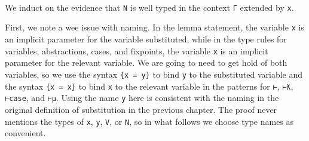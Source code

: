 \begin{fence}
\begin{code}
\>[25]\AgdaSpace{}%
\AgdaSymbol{(}\AgdaSpace{}%
\AgdaSpace{}%
\AgdaSymbol{)}\AgdaSpace{}%
\AgdaSymbol{(}\AgdaSpace{}%
\AgdaSpace{}%
\AgdaSymbol{)}\AgdaSpace{}%
\AgdaSymbol{(}\AgdaSpace{}%
\AgdaSpace{}%
\AgdaSymbol{(}\AgdaSpace{}%
\AgdaSpace{}%
\AgdaSymbol{))}\<%
\\
\>[0]\AgdaSpace{}%
\AgdaSymbol{\{}\AgdaSpace{}%
\AgdaSymbol{=}\AgdaSpace{}%
\AgdaSymbol{\}}\AgdaSpace{}%
\AgdaSpace{}%
\AgdaSymbol{(}\AgdaSpace{}%
\AgdaSymbol{\{}\AgdaSpace{}%
\AgdaSymbol{=}\AgdaSpace{}%
\AgdaSymbol{\}}\AgdaSpace{}%
\AgdaSymbol{)}\AgdaSpace{}%
\AgdaSpace{}%
\AgdaSpace{}%
\AgdaSpace{}%
\<%
\\
\>[0]\AgdaSpace{}%
\AgdaSymbol{|}\AgdaSpace{}%
\AgdaSpace{}%
%
\>[22]\AgdaSymbol{=}%
\>[25]\AgdaSpace{}%
\AgdaSymbol{(}\AgdaSpace{}%
\AgdaSymbol{)}\<%
\\
\>[0]\AgdaSpace{}%
\AgdaSymbol{|}\AgdaSpace{}%
%
\>[10]%
\>[22]\AgdaSymbol{=}%
\>[25]\AgdaSpace{}%
\AgdaSymbol{(}\AgdaSpace{}%
\AgdaSpace{}%
\AgdaSymbol{(}\AgdaSpace{}%
\AgdaSpace{}%
\AgdaSymbol{))}\<%
\end{code}
\end{fence}

We induct on the evidence that \texttt{N} is well typed in the context
\texttt{Γ} extended by \texttt{x}.

First, we note a wee issue with naming. In the lemma statement, the
variable \texttt{x} is an implicit parameter for the variable
substituted, while in the type rules for variables, abstractions, cases,
and fixpoints, the variable \texttt{x} is an implicit parameter for the
relevant variable. We are going to need to get hold of both variables,
so we use the syntax \texttt{\{x\ =\ y\}} to bind \texttt{y} to the
substituted variable and the syntax \texttt{\{x\ =\ x\}} to bind
\texttt{x} to the relevant variable in the patterns for
\texttt{⊢\textasciigrave{}}, \texttt{⊢ƛ}, \texttt{⊢case}, and
\texttt{⊢μ}. Using the name \texttt{y} here is consistent with the
naming in the original definition of substitution in the previous
chapter. The proof never mentions the types of \texttt{x}, \texttt{y},
\texttt{V}, or \texttt{N}, so in what follows we choose type names as
convenient.

